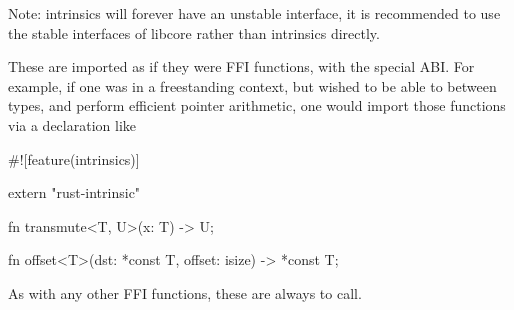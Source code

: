 \begin{myquote}
Note: intrinsics will forever have an unstable interface, it is recommended to use the stable interfaces of libcore rather 
than intrinsics directly.
\end{myquote}

These are imported as if they were FFI functions, with the special  ABI. For example, if one was in a 
freestanding context, but wished to be able to  between types, and perform efficient pointer arithmetic, one 
would import those functions via a declaration like

\begin{rustc}
#![feature(intrinsics)]

extern "rust-intrinsic" {
    fn transmute<T, U>(x: T) -> U;

    fn offset<T>(dst: *const T, offset: isize) -> *const T;
}
\end{rustc}

As with any other FFI functions, these are always  to call.
